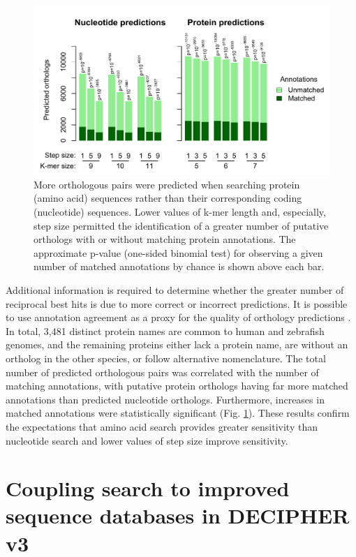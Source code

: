 \begin{figure}
\includegraphics[width=1\linewidth]{figures/Fig5} \caption{More orthologous pairs were predicted when searching protein (amino acid) sequences rather than their corresponding coding (nucleotide) sequences. Lower values of k-mer length and, especially, step size permitted the identification of a greater number of putative orthologs with or without matching protein annotations. The approximate p-value (one-sided binomial test) for observing a given number of matched annotations by chance is shown above each bar.}\label{fig:fig5}
\end{figure}

Additional information is required to determine whether the greater number of reciprocal best hits is due to more correct or incorrect predictions. It is possible to use annotation agreement as a proxy for the quality of orthology predictions \citep{RN257}. In total, 3,481 distinct protein names are common to human and zebrafish genomes, and the remaining proteins either lack a protein name, are without an ortholog in the other species, or follow alternative nomenclature. The total number of predicted orthologous pairs was correlated with the number of matching annotations, with putative protein orthologs having far more matched annotations than predicted nucleotide orthologs. Furthermore, increases in matched annotations were statistically significant (Fig. \ref{fig:fig5}). These results confirm the expectations that amino acid search provides greater sensitivity than nucleotide search and lower values of step size improve sensitivity.

\section{Coupling search to improved sequence databases in DECIPHER v3}\label{coupling-search-to-improved-sequence-databases-in-decipher-v3}

